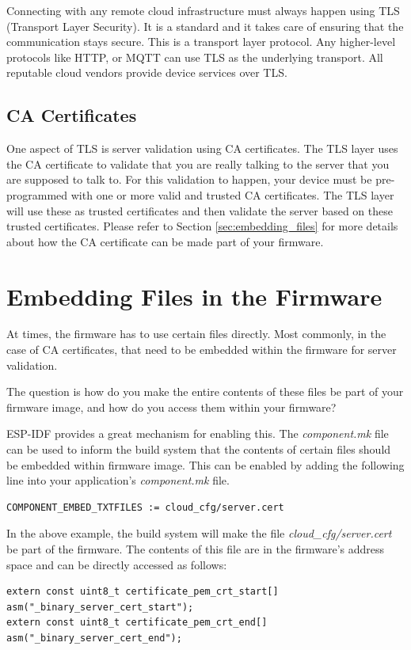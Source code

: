 \documentclass[main.tex]{subfiles}
\begin{document}
Connecting with any remote cloud infrastructure must always happen using TLS (Transport Layer Security). It is a standard and it takes care of ensuring that the communication stays secure. This is a transport layer protocol. Any higher-level protocols like HTTP, or MQTT can use TLS as the underlying transport. All reputable cloud vendors provide device services over TLS.

\subsection{CA Certificates}
One aspect of TLS is server validation using CA certificates. The TLS layer uses the CA certificate to validate that you are really talking to the server that you are supposed to talk to. For this validation to happen, your device must be pre-programmed with one or more valid and trusted CA certificates. The TLS layer will use these as trusted certificates and then validate the server based on these trusted certificates. Please refer to Section \ref{sec:embedding_files} for more details about how the CA certificate can be made part of your firmware.

\section{Embedding Files in the Firmware}\label{sec:embedding_files}
At times, the firmware has to use certain files directly. Most commonly, in the case of CA certificates, that need to be embedded within the firmware for server validation.

The question is how do you make the entire contents of these files be part of your firmware image, and how do you access them within your firmware?

ESP-IDF provides a great mechanism for enabling this. The \textit{component.mk} file can be used to inform the build system that the contents of certain files should be embedded within firmware image. This can be enabled by adding the following line into your application's \textit{component.mk} file.

\begin{verbatim}
COMPONENT_EMBED_TXTFILES := cloud_cfg/server.cert 
\end{verbatim}

In the above example, the build system will make the file \textit{cloud\_cfg/server.cert} be part of the firmware. The contents of this file are in the firmware's address space and can be directly accessed as follows:
\begin{verbatim}
extern const uint8_t certificate_pem_crt_start[] asm("_binary_server_cert_start");
extern const uint8_t certificate_pem_crt_end[] asm("_binary_server_cert_end");
\end{verbatim}
\end{document}
